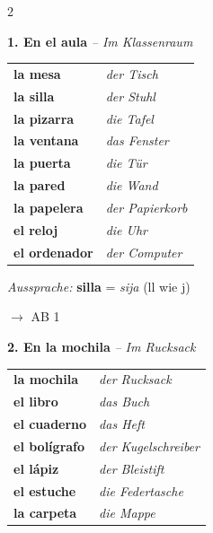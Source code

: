 \documentclass[11pt, a4paper]{article}
\newcommand{\seriftext}[1]{{\fontfamily{ppl}\selectfont #1}}
\newcommand{\es}[1]{\seriftext{\textbf{#1}}}
\newcommand{\de}[1]{\textit{\textcolor{akzent}{#1}}}
\newcommand{\abmark}[1]{{\footnotesize\textcolor{akzent}{$\rightarrow$ AB #1}}}
\newcommand{\abschnitt}[2]{\noindent\textbf{\large #1. #2}}
\begin{document}
\begin{multicols}{2}

\abschnitt{1}{En el aula} \de{-- Im Klassenraum}

\vspace{4pt}

\begin{tabular}{@{}ll@{}}
\es{la mesa} & \de{der Tisch} \\[0.4em]
\es{la silla} & \de{der Stuhl} \\[0.4em]
\es{la pizarra} & \de{die Tafel} \\[0.4em]
\es{la ventana} & \de{das Fenster} \\[0.4em]
\es{la puerta} & \de{die Tür} \\[0.4em]
\es{la pared} & \de{die Wand} \\[0.4em]
\es{la papelera} & \de{der Papierkorb} \\[0.4em]
\es{el reloj} & \de{die Uhr} \\[0.4em]
\es{el ordenador} & \de{der Computer} \\
\end{tabular}

\vspace{4pt}

\begin{tippbox}
\footnotesize\textit{Aussprache:} \es{silla} = \textit{sija} (ll wie j)
\end{tippbox}

\abmark{1}

\vspace{8pt}

\abschnitt{2}{En la mochila} \de{-- Im Rucksack}

\vspace{4pt}

\begin{tabular}{@{}ll@{}}
\es{la mochila} & \de{der Rucksack} \\[0.4em]
\es{el libro} & \de{das Buch} \\[0.4em]
\es{el cuaderno} & \de{das Heft} \\[0.4em]
\es{el bolígrafo} & \de{der Kugelschreiber} \\[0.4em]
\es{el lápiz} & \de{der Bleistift} \\[0.4em]
\es{el estuche} & \de{die Federtasche} \\[0.4em]
\es{la carpeta} & \de{die Mappe} \\
\end{tabular}


\end{multicols}
\end{document}
